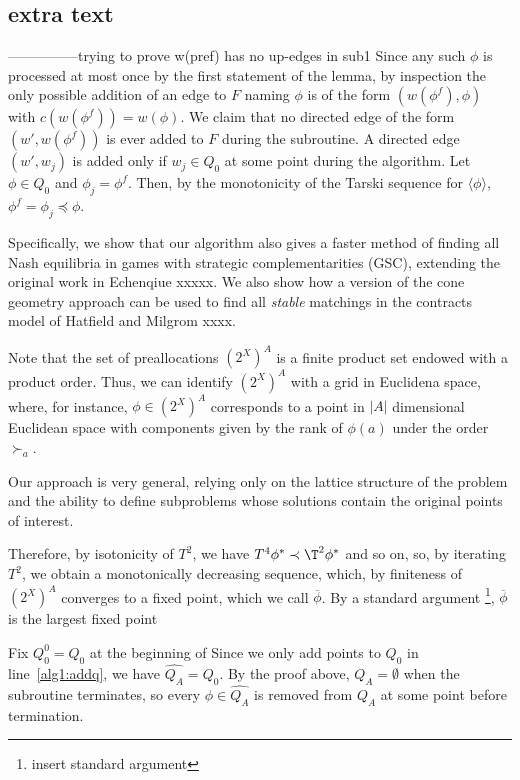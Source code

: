 \documentclass[11pt,reqno]{amsart}
\theoremstyle{definition}
\numberwithin{equation}{section}
\newcommand{\wh}{\widehat}
\newcommand{\ol}{\overline}
\newcommand{\lag}{\langle}
\newcommand{\rag}{\rangle}
\newcommand{\pre}{\phi}
\newcommand{\prealloc}{(2^X)^A}
\newcommand{\peq}{\preceq}
\newcommand{\su}{\succ}
\newcommand{\pe}{\prec}
\newcommand{\toppre}{\ol{\pre}}
\newcommand{\acto}{Q_0}
\newcommand{\acta}{Q_A}
\newcommand{\actacum}{\wh{Q_A}}
\newcommand{\actocum}{\wh{Q_0}}
\newcommand{\forest}{F}
\begin{document}
\begin{enumerate}
\section{extra text} 

---------------trying to prove w(pref) has no up-edges in sub1 
Since any such $\pre$ is processed at most once by the first statement of the lemma, by inspection the only possible addition of an edge to $\forest$ naming $\pre$ is of the form $(w(\pre^f),\pre)$ with $c(w(\pre^f)) = w(\pre)$.  
We claim that no directed edge of the form $(w', w(\pre^f))$ is ever added to $\forest$ during the subroutine. 
A directed edge $(w',w_j)$ is added only if $w_j \in \acto$ at some point during the algorithm. 
Let $\pre \in \acto$ and $\pre_j = \pre^f$. 
Then, by the monotonicity of the Tarski sequence for $\lag \pre \rag$, $\pre^f = \pre_j \peq \pre$.

Specifically, we show that our algorithm also gives a faster method of finding all Nash equilibria in games with strategic complementarities (GSC), extending the original work in Echenqiue xxxxx.  
We also show how a version of the cone geometry approach can be used to find all \emph{stable} matchings in the contracts model of Hatfield and Milgrom xxxx.  

Note that the set of preallocations $\prealloc$ is a finite product set endowed with a product order.
Thus, we can identify $\prealloc$ with a grid in Euclidena space, where, for instance, $\pre \in \prealloc$ corresponds to a point in $|A|$ dimensional Euclidean space with components given by the rank of $\pre(a)$ under the order $\su_a$. 

Our approach is very general, relying only on the lattice structure of the problem and the ability to define subproblems whose solutions contain the original points of interest.  

Therefore, by isotonicity of $T^2$, we have $T^4 \pre^* \pe \T^2 \pre^*$ and so on, so, by iterating $T^2$, we obtain a monotonically decreasing sequence, which, by finiteness of $\prealloc$ converges to a fixed point, which we call $\toppre$.
By a standard argument \footnote{insert standard argument}, $\toppre$ is the largest fixed point 

Fix $\acto^{0} = \acto$ at the beginning of 
Since we only add points to $\acto$ in line~\ref{alg1:addq}, we have $\actacum = \actocum$. 
By the proof above, $\acta = \emptyset$ when the subroutine terminates, so every $\pre \in \actacum$ is removed from $\acta$ at some point before termination.




\end{enumerate}
\end{document}
